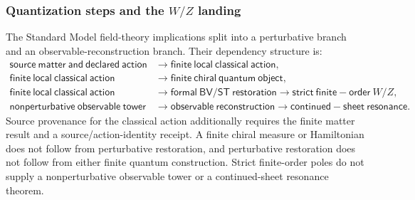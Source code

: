 \subsubsection*{Quantization steps and the \(W/Z\) landing}

The Standard Model field-theory implications split into a perturbative branch
and an observable-reconstruction branch. Their dependency structure is:
\begingroup\small
\[
\begin{aligned}
\mathsf{source\ matter\ and\ declared\ action}
  &\longrightarrow \mathsf{finite\ local\ classical\ action},\\
\mathsf{finite\ local\ classical\ action}
  &\longrightarrow \mathsf{finite\ chiral\ quantum\ object},\\
\mathsf{finite\ local\ classical\ action}
  &\longrightarrow \mathsf{formal\ BV/ST\ restoration}
  \longrightarrow \mathsf{strict\ finite\!-\!order\ }W/Z,\\
\mathsf{nonperturbative\ observable\ tower}
  &\longrightarrow \mathsf{observable\ reconstruction}
  \longrightarrow \mathsf{continued\!-\!sheet\ resonance}.
\end{aligned}
\]
\endgroup
Source provenance for the classical action additionally requires the finite
matter result and a source/action-identity receipt. A finite chiral measure or
Hamiltonian does not follow from perturbative restoration, and perturbative
restoration does not follow from either finite quantum construction. Strict
finite-order poles do not supply a nonperturbative observable tower or a
continued-sheet resonance theorem.

